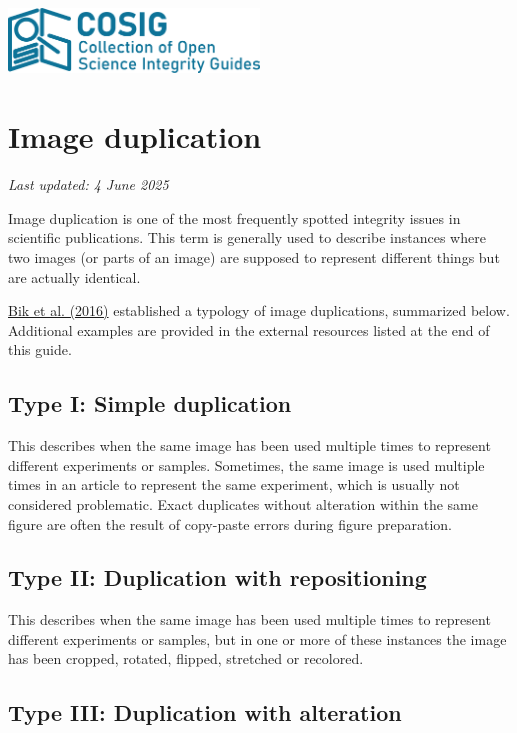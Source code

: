 \documentclass[letterpaper, 12pt]{article}
\begin{document}
\flushleft
\includegraphics[width=0.5\textwidth]{img/home/241017_final_logo_mockup.png}

\section*{Image duplication}
\textit{Last updated: 4 June 2025}

Image duplication is one of the most frequently spotted integrity issues in scientific publications. This term is generally used to describe instances where two images (or parts of an image) are supposed to represent different things but are actually identical.

\href{https://doi.org/10.1128/mbio.00809-16}{Bik et al. (2016)} established a typology of image duplications, summarized below. Additional examples are provided in the external resources listed at the end of this guide.

\subsection*{Type I: Simple duplication}

This describes when the same image has been used multiple times to represent different experiments or samples. Sometimes, the same image is used multiple times in an article to represent the same experiment, which is usually not considered problematic. Exact duplicates without alteration within the same figure are often the result of copy-paste errors during figure preparation.

\subsection*{Type II: Duplication with repositioning}

This describes when the same image has been used multiple times to represent different experiments or samples, but in one or more of these instances the image has been cropped, rotated, flipped, stretched or recolored.

\subsection*{Type III: Duplication with alteration} 
\end{document}
